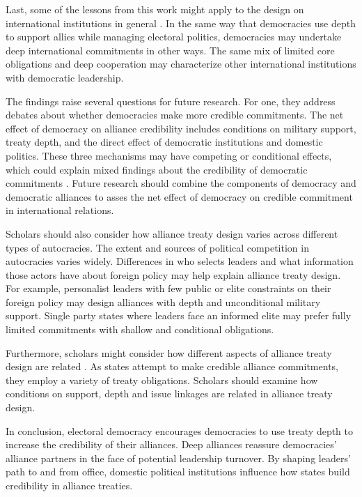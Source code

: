 \documentclass[12pt]{article}
\begin{document}
Last, some of the lessons from this work might apply to the design on international institutions in general \citep{DownesRocke1995, MartinSimmons1998, Koremenosetal2001, Thompson2010}.
In the same way that democracies use depth to support allies while managing electoral politics, democracies may undertake deep international commitments in other ways. 
The same mix of limited core obligations and deep cooperation may characterize other international institutions with democratic leadership. 


The findings raise several questions for future research.  
For one, they address debates about whether democracies make more credible commitments. 
The net effect of democracy on alliance credibility includes conditions on military support, treaty depth, and the direct effect of democratic institutions and domestic politics. 
These three mechanisms may have competing or conditional effects, which could explain mixed findings about the credibility of democratic commitments \citep{Schultz1999, Leeds1999, Thyne2012, DownesSechser2012, PotterBaum2014}.
Future research should combine the components of democracy and democratic alliances to asses the net effect of democracy on credible commitment in international relations. 


Scholars should also consider how alliance treaty design varies across different types of autocracies. 
The extent and sources of political competition in autocracies varies widely. 
Differences in who selects leaders and what information those actors have about foreign policy \citep{Weeks2008} may help explain alliance treaty design.
For example, personalist leaders with few public or elite constraints on their foreign policy may design alliances with depth and unconditional military support. 
Single party states where leaders face an informed elite may prefer fully limited commitments with shallow and conditional obligations. 


Furthermore, scholars might consider how different aspects of alliance treaty design are related \citep{FjelstulReiter2019}. 
As states attempt to make credible alliance commitments, they employ a variety of treaty obligations. 
Scholars should examine how conditions on support, depth and issue linkages are related in alliance treaty design. 


In conclusion, electoral democracy encourages democracies to use treaty depth to increase the credibility of their alliances. 
Deep alliances reassure democracies' alliance partners in the face of potential leadership turnover. 
By shaping leaders' path to and from office, domestic political institutions influence how states build credibility in alliance treaties.




 
 
\end{document}
